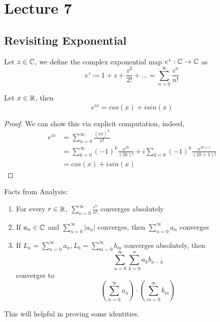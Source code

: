 \section{Lecture 7}

\subsection{Revisiting Exponential}

\begin{definition}
    Let $z \in \mathbb{C}$, we define the complex exponential map $e^z: \mathbb{C} \to \mathbb{C}$ as
    \[e^z \coloneqq 1 + z + \frac{z^2}{2!} + ... = \sum_{n = 0}^\infty \frac{z^n}{n!}\]
\end{definition}

\begin{theorem}
Let $x \in \mathbb{R}$, then
\[e^{ix} = cos(x) + i sin(x)\]
\end{theorem}

\begin{proof}
We can show this via explicit computation, indeed,
\begin{align*}
    e^{ix} &= \sum_{n = 0}^\infty \frac{(ix)^n}{n!}\\
    &= \sum_{k = 0}^\infty (-1)^k \frac{x^{2k}}{(2k)!} + i \sum_{k = 0} (-1)^k \frac{x^{2k + 1}}{(2k + 1)!} \tag*{Separate even and odd degree terms}\\
    &= cos(x) + i sin(x) \tag*{Taylor Series}
\end{align*}
\end{proof}

\begin{lemma}\label{lem::real_analy_fact}
Facts from Analysis:
\begin{enumerate}
    \item For every $r \in \mathbb{R}$, $\sum_{n = 0}^\infty \frac{r^n}{n!}$ converges absolutely
    \item If $a_n \in \mathbb{C}$ and $\sum_{n = 0}^\infty |a_n|$ converges, then $\sum_{n = 0}^\infty a_n$ converges
    \item If $L_a = \sum_{n = 0}^\infty a_n, L_b = \sum_{m = 0}^\infty b_m$ converges absolutely, then
    \[\sum_{n = 0}^\infty \sum_{k = 0}^n a_k b_{n - k}\]
    converges to
    \[(\sum_{n = 0}^\infty a_n) \cdot (\sum_{m = 0}^\infty b_m)\]
\end{enumerate}
This will helpful in proving some identities.
\end{lemma}

